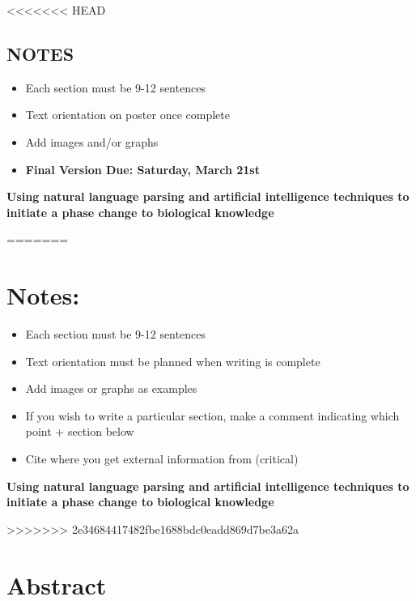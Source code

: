 \documentclass[11pt]{article}
\begin{document}
<<<<<<< HEAD
\subsection*{NOTES}
\begin{itemize}
\item Each section must be 9-12 sentences
\item Text orientation on poster once complete
\item Add images and/or graphs 
\item \textbf{Final Version Due: Saturday, March 21st}
\end{itemize}

\begin{flushleft}
  \vspace{3mm}
         {\bf Using natural language parsing and artificial intelligence techniques to initiate a phase change to biological knowledge}\\
\end{flushleft}
=======
\section{Notes:}
\begin{itemize}
\item Each section must be 9-12 sentences
\item Text orientation must be planned when writing is complete
\item Add images or graphs as examples
\item If you wish to write a particular section, make a comment indicating which point + section below
\item Cite where you get external information from (critical)
\end{itemize}

\begin{center}
  \vspace{3mm}
         {\bf Using natural language parsing and artificial intelligence techniques to initiate a phase change to biological knowledge}\\
\end{center}
>>>>>>> 2e34684417482fbe1688bdc0eadd869d7be3a62a

\section{Abstract}
\end{document}
